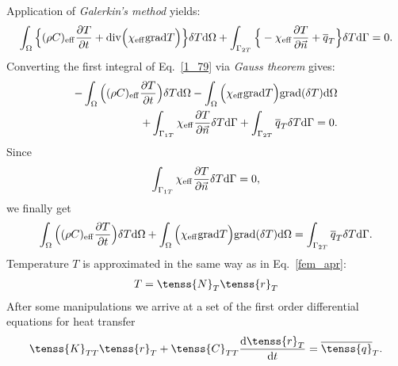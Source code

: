 Application of {\it Galerkin's method} yields:
\begin{eqnarray}\label{1_79}
\int_{\Omega}\Big\{ (\rho C)_{\rm eff} \frac{\partial T}{\partial t}  
+ {\rm div}\Big(\chi_{\rm eff} {\rm grad} T\Big)\Big\} \delta T {\rm d} \Omega
+ \int_{\Gamma_{2T}}\Big\{ - \chi_{\rm eff} \frac{\partial T}{\partial \vec{n}} + 
\overline{q}_{T}\Big\}\delta T {\rm d} \Gamma = 0.
\end{eqnarray}
Converting the first integral of Eq.~\eqref{1_79} via {\it Gauss theorem} gives:
\begin{eqnarray}
-\int_{\Omega}\Big( (\rho C)_{\rm eff} \frac{\partial T}{\partial t}\Big) \delta T {\rm d} \Omega
-\int_{\Omega} \Big(\chi_{\rm eff}{\rm grad} T \Big) {\rm grad}(\delta T) {\rm d} \Omega \nonumber\\
+ \int_{\Gamma_{1T}} \chi_{\rm eff} \frac{\partial T}{\partial \vec{n}}\delta T {\rm d} \Gamma
+ \int_{\Gamma_{2T}}\overline{q}_{T}\delta T {\rm d} \Gamma = 0.
\end{eqnarray}
Since
\begin{eqnarray}
\int_{\Gamma_{1T}} \chi_{\rm eff} \frac{\partial T}{\partial \vec{n}}\delta T {\rm d} \Gamma
 = 0,
\end{eqnarray}
we finally get
\begin{eqnarray}\label{fem_couplh}
\int_{\Omega}\Big( (\rho C)_{\rm eff} \frac{\partial T}{\partial t}\Big) \delta T {\rm d} \Omega
+\int_{\Omega} \Big(\chi_{\rm eff}{\rm grad} T \Big) {\rm grad}(\delta T) {\rm d} \Omega
= \int_{\Gamma_{2T}}\overline{q}_{T}\delta T {\rm d} \Gamma.
\end{eqnarray}
Temperature $T$ is approximated in the same way as in Eq.~\eqref{fem_apr}:
\begin{eqnarray}\label{fem_ap}
T = \tenss{N}_T \tenss{r}_T
\end{eqnarray}
After some manipulations we arrive at a set of the first order differential equations for heat transfer
\begin{eqnarray}\label{fem_couplh_matr}
\tenss{K}_{TT} \tenss{r}_{T} + \tenss{C}_{TT} \frac{{\rm d}\tenss{r}_{T}}{{\rm d}t} 
=\overline{\tenss{q}}_{T}.
\end{eqnarray}

